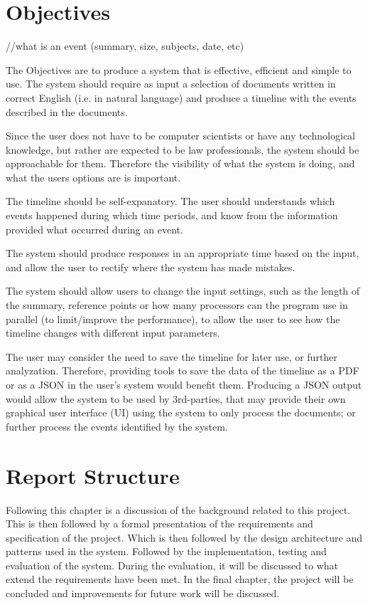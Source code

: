 \documentclass[11pt]{informatics-report}
\begin{document}
\section{Objectives}
//what is an event (summary, size, subjects, date, etc)
\par The Objectives are to produce a system that is effective, efficient and simple to use. The system should require as input a selection of documents written in correct English (i.e. in natural language) and produce a timeline with the events described in the documents.
\par Since the user does not have to be computer scientists or have any technological knowledge, but rather are expected to be law professionals, the system should be approachable for them. Therefore the visibility of what the system is doing, and what the users options are is important. 
\par The timeline should be self-expanatory. The user should understands which events happened during which time periods, and know from the information provided what occurred during an event. 
\par The system should produce responses in an appropriate time based on the input, and allow the user to rectify where the system has made mistakes. 
\par The system should allow users to change the input settings, such as the length of the summary, reference points or how many processors can the program use in parallel (to limit/improve the performance), to allow the user to see how the timeline changes with different input parameters.
\par The user may consider the need to save the timeline for later use, or further analyzation. Therefore, providing tools to save the data of the timeline as a PDF or as a JSON in the user's system would benefit them. Producing a JSON output would allow the system to be used by 3rd-parties, that may provide their own graphical user interface (UI) using the system to only process the documents; or further process the events identified by the system.
\section{Report Structure}
\par Following this chapter is a discussion of the background related to this project. This is then followed by a formal presentation of the requirements and specification of the project. Which is then followed by the design architecture and patterns used in the system. Followed by the implementation, testing and evaluation of the system. During the evaluation, it will be discussed to what extend the requirements have been met. In the final chapter, the project will be concluded and improvements for future work will be discussed.
\end{document}
